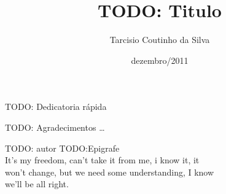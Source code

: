 \documentclass[pt,bsc,oneside,onehalfspacing]{risethesis}
\title{TODO: Titulo}
\date{dezembro/2011}
\author{Tarcisio Coutinho da Silva}
\begin{document}
\frontmatter
\frontpage
\presentationpage

\begin{dedicatory}
TODO: Dedicatoria rápida
\end{dedicatory}

\acknowledgements
TODO: Agradecimentos
\ldots

\begin{epigraph}{TODO: autor}
TODO:Epigrafe\\
\vspace{0.5cm}
It's my freedom, can't take it from me, i know it, it\\
won't change, but we need some understanding, I know\\
we'll be all right.
\end{epigraph}

\resumo


\abstract


\tableofcontents
\listoffigures
\listoftables


\mainmatter








\clearpage
\addappheadtotoc
\appendix
\appendixpage

\end{document}
